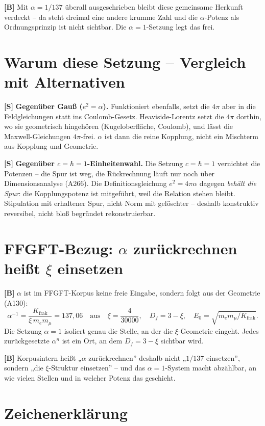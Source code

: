 \textbf{[B]} Mit $\alpha=1/137$ überall ausgeschrieben bleibt diese gemeinsame
Herkunft verdeckt -- da steht dreimal eine andere krumme Zahl und die
$\alpha$-Potenz als Ordnungsprinzip ist nicht sichtbar. Die $\alpha=1$-Setzung
legt das frei.

\section{Warum diese Setzung -- Vergleich mit Alternativen}

\textbf{[S]} \textbf{Gegenüber Gauß ($e^2=\alpha$).} Funktioniert ebenfalls,
setzt die $4\pi$ aber in die Feldgleichungen statt ins Coulomb-Gesetz.
Heaviside-Lorentz setzt die $4\pi$ dorthin, wo sie geometrisch hingehören
(Kugeloberfläche, Coulomb), und lässt die Maxwell-Gleichungen $4\pi$-frei.
$\alpha$ ist dann die reine Kopplung, nicht ein Mischterm aus Kopplung und
Geometrie.

\textbf{[S]} \textbf{Gegenüber $c=\hbar=1$-Einheitenwahl.} Die Setzung
$c=\hbar=1$ vernichtet die Potenzen -- die Spur ist weg, die Rückrechnung
läuft nur noch über Dimensionsanalyse (A266). Die Definitionsgleichung
$e^2=4\pi\alpha$ dagegen \emph{behält die Spur}: die Kopplungspotenz ist
mitgeführt, weil die Relation stehen bleibt. Stipulation mit erhaltener Spur,
nicht Norm mit gelöschter -- deshalb konstruktiv reversibel, nicht bloß
begründet rekonstruierbar.

\section{FFGFT-Bezug: $\alpha$ zurückrechnen heißt $\xi$ einsetzen}

\textbf{[B]} $\alpha$ ist im FFGFT-Korpus keine freie Eingabe, sondern folgt
aus der Geometrie (A130):
\[
  \alpha^{-1} = \frac{K_\text{frak}}{\xi\,m_em_\mu} = 137{,}06 \quad\text{aus}\quad \xi = \frac{4}{30000},
  \quad D_f = 3-\xi, \quad E_0=\sqrt{m_em_\mu/K_\text{frak}}.
\]
Die Setzung $\alpha=1$ isoliert genau die Stelle, an der die $\xi$-Geometrie
eingeht. Jedes zurückgesetzte $\alpha^n$ ist ein Ort, an dem $D_f=3-\xi$
sichtbar wird.

\textbf{[B]} Korpusintern heißt „$\alpha$ zurückrechnen'' deshalb nicht
„$1/137$ einsetzen'', sondern „die $\xi$-Struktur einsetzen'' -- und das
$\alpha{=}1$-System macht abzählbar, an wie vielen Stellen und in welcher
Potenz das geschieht.

\section{Zeichenerklärung}

